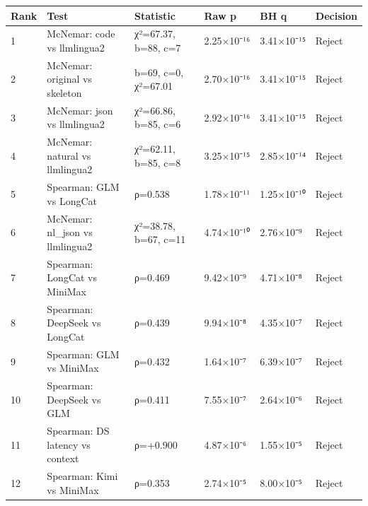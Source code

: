 {\def\LTcaptype{none} %

\begin{longtable}[]{@{}llllll@{}}

\toprule\noalign{}

Rank & Test & Statistic & Raw p & BH q & Decision \\

\midrule\noalign{}

\endhead

\bottomrule\noalign{}

\endlastfoot

1 & McNemar: code vs llmlingua2 & χ²=67.37, b=88, c=7 & 2.25×10⁻¹⁶ & 3.41×10⁻¹⁵ & Reject \\

2 & McNemar: original vs skeleton & b=69, c=0, χ²=67.01 & 2.70×10⁻¹⁶ & 3.41×10⁻¹⁵ & Reject \\

3 & McNemar: json vs llmlingua2 & χ²=66.86, b=85, c=6 & 2.92×10⁻¹⁶ & 3.41×10⁻¹⁵ & Reject \\

4 & McNemar: natural vs llmlingua2 & χ²=62.11, b=85, c=8 & 3.25×10⁻¹⁵ & 2.85×10⁻¹⁴ & Reject \\

5 & Spearman: GLM vs LongCat & ρ=0.538 & 1.78×10⁻¹¹ & 1.25×10⁻¹⁰ & Reject \\

6 & McNemar: nl\_json vs llmlingua2 & χ²=38.78, b=67, c=11 & 4.74×10⁻¹⁰ & 2.76×10⁻⁹ & Reject \\

7 & Spearman: LongCat vs MiniMax & ρ=0.469 & 9.42×10⁻⁹ & 4.71×10⁻⁸ & Reject \\

8 & Spearman: DeepSeek vs LongCat & ρ=0.439 & 9.94×10⁻⁸ & 4.35×10⁻⁷ & Reject \\

9 & Spearman: GLM vs MiniMax & ρ=0.432 & 1.64×10⁻⁷ & 6.39×10⁻⁷ & Reject \\

10 & Spearman: DeepSeek vs GLM & ρ=0.411 & 7.55×10⁻⁷ & 2.64×10⁻⁶ & Reject \\

11 & Spearman: DS latency vs context & ρ=+0.900 & 4.87×10⁻⁶ & 1.55×10⁻⁵ & Reject \\

12 & Spearman: Kimi vs MiniMax & ρ=0.353 & 2.74×10⁻⁵ & 8.00×10⁻⁵ & Reject \\


\end{longtable}}
